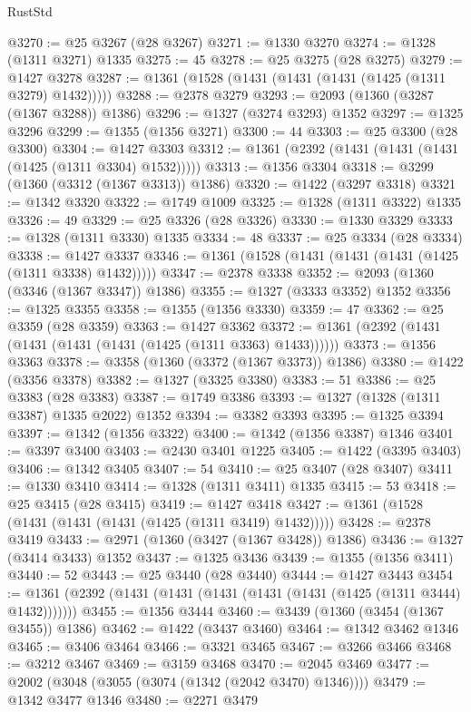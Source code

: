 \begin{lexlean}{RustStd}
\begin{coremodule}
@3270 := @25 @3267 (@28 @3267)
@3271 := @1330 @3270
@3274 := @1328 (@1311 @3271) @1335
@3275 := 45
@3278 := @25 @3275 (@28 @3275)
@3279 := @1427 @3278
@3287 := @1361 (@1528 (@1431 (@1431 (@1431 (@1425 (@1311 @3279) @1432)))))
@3288 := @2378 @3279
@3293 := @2093 (@1360 (@3287 (@1367 @3288)) @1386)
@3296 := @1327 (@3274 @3293) @1352
@3297 := @1325 @3296
@3299 := @1355 (@1356 @3271)
@3300 := 44
@3303 := @25 @3300 (@28 @3300)
@3304 := @1427 @3303
@3312 := @1361 (@2392 (@1431 (@1431 (@1431 (@1425 (@1311 @3304) @1532)))))
@3313 := @1356 @3304
@3318 := @3299 (@1360 (@3312 (@1367 @3313)) @1386)
@3320 := @1422 (@3297 @3318)
@3321 := @1342 @3320
@3322 := @1749 @1009
@3325 := @1328 (@1311 @3322) @1335
@3326 := 49
@3329 := @25 @3326 (@28 @3326)
@3330 := @1330 @3329
@3333 := @1328 (@1311 @3330) @1335
@3334 := 48
@3337 := @25 @3334 (@28 @3334)
@3338 := @1427 @3337
@3346 := @1361 (@1528 (@1431 (@1431 (@1431 (@1425 (@1311 @3338) @1432)))))
@3347 := @2378 @3338
@3352 := @2093 (@1360 (@3346 (@1367 @3347)) @1386)
@3355 := @1327 (@3333 @3352) @1352
@3356 := @1325 @3355
@3358 := @1355 (@1356 @3330)
@3359 := 47
@3362 := @25 @3359 (@28 @3359)
@3363 := @1427 @3362
@3372 := @1361 (@2392 (@1431 (@1431 (@1431 (@1431 (@1425 (@1311 @3363) @1433))))))
@3373 := @1356 @3363
@3378 := @3358 (@1360 (@3372 (@1367 @3373)) @1386)
@3380 := @1422 (@3356 @3378)
@3382 := @1327 (@3325 @3380)
@3383 := 51
@3386 := @25 @3383 (@28 @3383)
@3387 := @1749 @3386
@3393 := @1327 (@1328 (@1311 @3387) @1335 @2022) @1352
@3394 := @3382 @3393
@3395 := @1325 @3394
@3397 := @1342 (@1356 @3322)
@3400 := @1342 (@1356 @3387) @1346
@3401 := @3397 @3400
@3403 := @2430 @3401 @1225
@3405 := @1422 (@3395 @3403)
@3406 := @1342 @3405
@3407 := 54
@3410 := @25 @3407 (@28 @3407)
@3411 := @1330 @3410
@3414 := @1328 (@1311 @3411) @1335
@3415 := 53
@3418 := @25 @3415 (@28 @3415)
@3419 := @1427 @3418
@3427 := @1361 (@1528 (@1431 (@1431 (@1431 (@1425 (@1311 @3419) @1432)))))
@3428 := @2378 @3419
@3433 := @2971 (@1360 (@3427 (@1367 @3428)) @1386)
@3436 := @1327 (@3414 @3433) @1352
@3437 := @1325 @3436
@3439 := @1355 (@1356 @3411)
@3440 := 52
@3443 := @25 @3440 (@28 @3440)
@3444 := @1427 @3443
@3454 := @1361 (@2392 (@1431 (@1431 (@1431 (@1431 (@1431 (@1425 (@1311 @3444) @1432)))))))
@3455 := @1356 @3444
@3460 := @3439 (@1360 (@3454 (@1367 @3455)) @1386)
@3462 := @1422 (@3437 @3460)
@3464 := @1342 @3462 @1346
@3465 := @3406 @3464
@3466 := @3321 @3465
@3467 := @3266 @3466
@3468 := @3212 @3467
@3469 := @3159 @3468
@3470 := @2045 @3469
@3477 := @2002 (@3048 (@3055 (@3074 (@1342 (@2042 @3470) @1346))))
@3479 := @1342 @3477 @1346
@3480 := @2271 @3479

\end{coremodule}
\end{lexlean}
